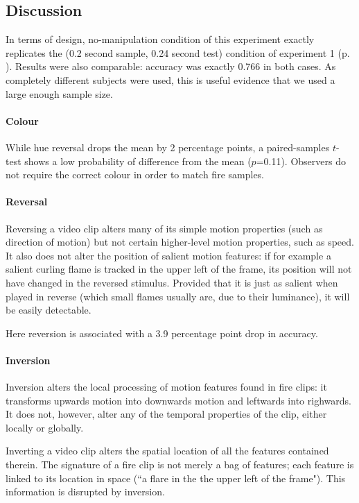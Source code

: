 \subsection{Discussion}

In terms of design, no-manipulation condition of this experiment exactly replicates the (0.2 second sample, 0.24 second test) condition of experiment 1 (p. \pageref{ex1:accs}). Results were also comparable: accuracy was exactly 0.766 in both cases. As completely different subjects were used, this is useful evidence that we used a large enough sample size.

\paragraph{Colour}
While hue reversal drops the mean by 2 percentage points, a paired-samples $t$-test shows a low probability of difference from the mean ($p$=0.11). Observers do not require the correct colour in order to match fire samples.

\paragraph{Reversal}

Reversing a video clip alters many of its simple motion properties (such as direction of motion) but not certain higher-level motion properties, such as speed. It also does not alter the position of salient motion features: if for example a salient curling flame is tracked in the upper left of the frame, its position will not have changed in the reversed stimulus. Provided that it is just as salient when played in reverse (which small flames usually are, due to their luminance), it will be easily detectable.

Here reversion is associated with a 3.9 percentage point drop in accuracy.

\paragraph{Inversion} 
Inversion alters the local processing of motion features found in fire clips: it transforms upwards motion into downwards motion and leftwards into righwards. It does not, however, alter any of the temporal properties of the clip, either locally or globally.

Inverting a video clip alters the spatial location of all the features contained therein. The signature of a fire clip is not merely a bag of features; each feature is linked to its location in space (``a flare in the the upper left of the frame"). This information is disrupted by inversion.


